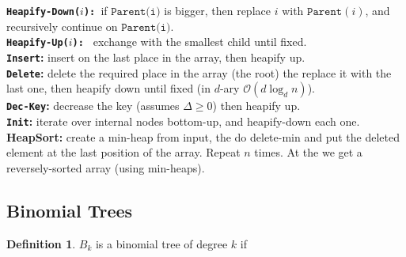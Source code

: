 \documentclass[]{article}
\newcommand\compactsubsection[1]        {\vspace{-10pt}\subsection{#1}\vspace{-6pt}}
\theoremstyle{definition}
\newtheorem{Definition}{\color{defiColor}Definition}
\newcommand\defi  [1] {\begin{Definition}#1\end{Definition}}
\newcommand\oc    {\mathcal{O}}
\begin{document}
\begin{multicols}{4}
\begin{figure}
				\end{figure}
				\textbf{\texttt{Heapify-Down($i$): }}if $\texttt{Parent(i)}$ is bigger, then replace $i$ with $\texttt{Parent}(i)$, and recursively continue on $\texttt{Parent(i)}$. \\
				\textbf{\texttt{Heapify-Up($i$): }} exchange with the smallest child until fixed. \\
				\textbf{\texttt{Insert}: }insert on the last place in the array, then heapify up. \\ 
				\textbf{\texttt{Delete}: }delete the required place in the array (the root) the replace it with the last one, then heapify down until fixed (in $d$-ary $\oc(d\log_dn)$). \\
				\textbf{\texttt{Dec-Key}: }decrease the key (assumes $\Delta \ge 0$) then heapify up. \\
				\textbf{\texttt{Init}: }iterate over internal nodes bottom-up, and heapify-down each one. \\
				\textbf{HeapSort: }create a min-heap from input, the do delete-min and put the deleted element at the last position of the array. Repeat $n$ times. At the we get a reversely-sorted array (using min-heaps). 
			
			\vspace{-5pt}
			\compactsubsection{Binomial Trees}
				\defi{$B_k$ is a binomial tree of degree $k$ if
				
}
\end{multicols}
\end{document}
